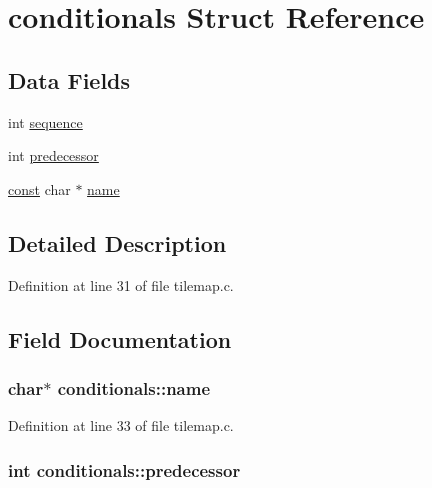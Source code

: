 \hypertarget{structconditionals}{\section{conditionals Struct Reference}
\label{structconditionals}
}
\subsection*{Data Fields}
\begin{DoxyCompactItemize}
\item 
int \hyperlink{structconditionals_a2da053b05811269cbffbec11dedd4526}{sequence}
\item 
int \hyperlink{structconditionals_a503bbb3a0799cf5d12b071a75c9be301}{predecessor}
\item 
\hyperlink{tradstdc_8h_a2c212835823e3c54a8ab6d95c652660e}{const} char $\ast$ \hyperlink{structconditionals_a75c723bbae350df36efd9cf63c9f0131}{name}
\end{DoxyCompactItemize}


\subsection{Detailed Description}


Definition at line 31 of file tilemap.\+c.



\subsection{Field Documentation}
\hypertarget{structconditionals_a75c723bbae350df36efd9cf63c9f0131}{
\subsubsection[{name}]{ char$\ast$ conditionals\+::name}}\label{structconditionals_a75c723bbae350df36efd9cf63c9f0131}


Definition at line 33 of file tilemap.\+c.

\hypertarget{structconditionals_a503bbb3a0799cf5d12b071a75c9be301}{
\subsubsection[{predecessor}]{\setlength{\rightskip}{0pt plus 5cm}int conditionals\+::predecessor}}\label{structconditionals_a503bbb3a0799cf5d12b071a75c9be301}


